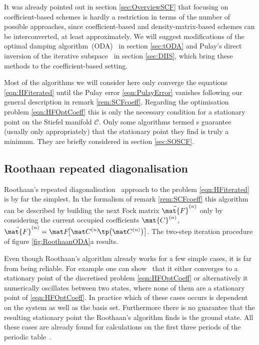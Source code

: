 It was already pointed out in section \vref{sec:OverviewSCF}
that focusing on coefficient-based schemes
is hardly a restriction in terms of the number of possible approaches,
since coefficient-based and density-matrix-based schemes can be interconverted,
at least approximately.
We will suggest modifications of the
optimal damping algorithm~(ODA)~\cite{Cances2000a} in section \ref{sec:tODA}
and Pulay's direct inversion of the iterative subspace~\cite{Pulay1982}
in section \ref{sec:DIIS},
which bring these methods to the coefficient-based setting.

Most of the \SCF algorithms we will consider here
only converge the \HF equations \eqref{eqn:HFiterated}
until the Pulay error \eqref{eqn:PulayError} vanishes
following our general description in remark \vref{rem:SCFcoeff}.
Regarding the \HF optimisation problem \eqref{eqn:HFOptCoeff}
this is only the necessary condition for a stationary point on the Stiefel
manifold $\mathcal{C}$.
Only some \SCF algorithms
termed s
guarantee (usually only appropriately)
that the stationary point they find is truly a minimum.
They are briefly considered in section \ref{sec:SOSCF}.

\subsection{Roothaan repeated diagonalisation}
\label{sec:RoothaanRepeatedDiag}

Roothaan's repeated diagonalisation~\cite{Roothaan1951}
approach to the \HF problem \eqref{eqn:HFiterated} is by far the simplest.
In the formalism of remark \vref{rem:SCFcoeff}
this algorithm can be described by building the next Fock matrix
$\tilde{\mat{F}}^{(n)}$ only by considering
the current occupied coefficients $\mat{C}^{(n)}$,
\ie $\tilde{\mat{F}}^{(n)} = \matFnfull$.
The two-step iteration procedure of figure \vref{fig:RoothaanODA}a results.

Even though Roothaan's algorithm already works for a few simple cases,
it is far from being reliable.
For example one can show~\cite{Cances2000,Cances2000b} that it
either converges to a stationary point of the
discretised \HF problem \eqref{eqn:HFOptCoeff}
or alternatively it numerically oscillates between two states,
where none of them are a stationary point of \eqref{eqn:HFOptCoeff}.
In practice which of these cases occurs is dependent on the system
as well as the basis set.
Furthermore there is no guarantee that the resulting stationary point
the Roothaan's algorithm finds is the \HF ground state.
All these cases are already found for \HF calculations
on the first three periods of the periodic table~\cite{Cances2000}.

